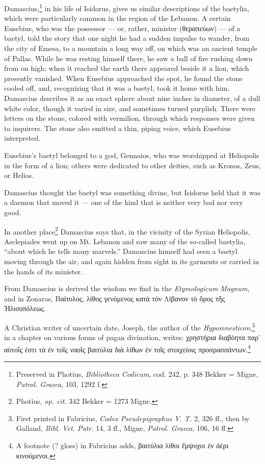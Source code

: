 \documentclass[a4paper, 12pt, oneside, polutonikogreek, english]{article}
\begin{document}
Damascius,\footnote{Preserved in Photius, \emph{Bibliotheca Codicum}, cod. 242, p. 348 Bekker = Migne, \emph{Patrol. Graeca}, 103, 1292 f.} in his life of Isidorus, gives us similar descriptions of the baetylia, which were particularly common in the region of the Lebanon. A certain Eusebius, who was the possessor --- or, rather, minister (θεραπεύων) --- of a baetyl, told the story that one night he had a sudden impulse to wander, from the city of Emesa, to a mountain a long way off, on which was an ancient temple of Pallas. While he was resting himself there, he saw a ball of fire rushing down from on high; when it reached the earth there appeared beside it a lion, which presently vanished. When Eusebius approached the spot, he found the stone cooled off, and, recognizing that it was a baetyl, took it home with him. Damascius describes it as an exact sphere about nine inches in diameter, of a dull white color, though it varied in size, and sometimes turned purplish. There were letters on the stone, colored with vermilion, through which responses were given to inquirers. The stone also emitted a thin, piping voice, which Eusebius interpreted.

Eusebius's baetyl belonged to a god, Gennaios, who was worshipped at Heliopolis in the form of a lion; others were dedicated to other deities, such as Kronos, Zeus, or Helios.

Damascius thought the baetyl was something divine, but Isidorus held that it was a daemon that moved it --- one of the kind that is neither very bad nor very good.

In another place\footnote{Photius, \emph{op. cit.} 342 Bekker = 1273 Migne.} Damascius says that, in the vicinity of the Syrian Heliopolis, Asclepiades went up on Mt. Lebanon and saw many of the so-called baetylia, ``about which he tells many marvels.'' Damascius himself had seen a baetyl moving through the air, and again hidden from sight in its garments or carried in the hands of its minister.

From Damascius is derived the wisdom we find in the \emph{Etymologicum Magnum}, and in Zonaras, Βαίτυλος, λίθος γενόμενος κατὰ τὸν Λίβανον τὸ ὄρος τῆς Ἡλιουπόλεως.

A Christian writer of uncertain date, Joseph, the author of the \emph{Hypomnesticon},\footnote{First printed in Fabricius, \emph{Codex Pseudepigraphus V. T.} 2, 326 ff., then by Galland, \emph{Bibl. Vet. Patr.} 14, 3 ff., Migne, \emph{Patrol. Graeca}, 106, 16 ff.} in a chapter on various forms of pagan divination, writes: χρηστήρια διαβόητα παρ' αὐτοῖς ἐστι τὰ ἐν τοῖς ναοῖς βαιτύλια διὰ λίθων ἐν τοῖς στοιχείοις προσρασσάντων.\footnote{A footnote (? gloss) in Fabricius adds, βαιτύλια λίθοι ἔμψυχοι ἐν ἀέρι κινούμενοι.}
\end{document}
